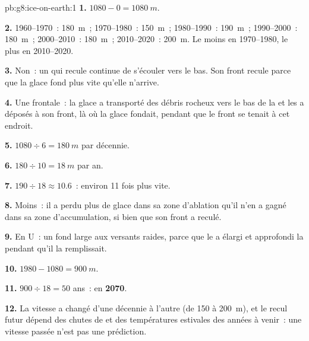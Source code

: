 \begin{solution}{pb:g8:ice-on-earth:1}
\textbf{1.} $1080 - 0 = \qty{1080}{m}$.

\textbf{2.} 1960--1970~: \qty{180}{m}~; 1970--1980~: \qty{150}{m}~;
1980--1990~: \qty{190}{m}~; 1990--2000~: \qty{180}{m}~; 2000--2010~:
\qty{180}{m}~; 2010--2020~: \qty{200}{m}. Le moins en 1970--1980, le plus
en 2010--2020.

\textbf{3.} Non~: un  qui recule continue de s'écouler vers le bas.
Son front recule parce que la glace fond plus vite qu'elle n'arrive.

\textbf{4.} Une  frontale~: la glace a transporté des débris
rocheux vers le bas de la  et les a déposés à son front, là où la
glace fondait, pendant que le front se tenait à cet endroit.

\textbf{5.} $1080 \div 6 = \qty{180}{m}$ par décennie.

\textbf{6.} $180 \div 10 = \qty{18}{m}$ par an.

\textbf{7.} $190 \div 18 \approx 10.6$~: environ 11 fois plus vite.

\textbf{8.} Moins~: il a perdu plus de glace dans sa zone d'ablation qu'il
n'en a gagné dans sa zone d'accumulation, si bien que son front a reculé.

\textbf{9.} En U~: un fond large aux versants raides, parce que le 
a élargi et approfondi la  pendant qu'il la remplissait.

\textbf{10.} $1980 - 1080 = \qty{900}{m}$.

\textbf{11.} $900 \div 18 = 50$ ans~: en \textbf{2070}.

\textbf{12.} La vitesse a changé d'une décennie à l'autre (de 150 à
\qty{200}{m}), et le recul futur dépend des chutes de  et des
températures estivales des années à venir~: une vitesse passée n'est pas
une prédiction.
\end{solution}
